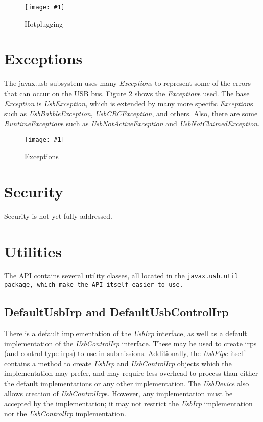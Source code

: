 \documentclass{article}
\newcommand{\myclass}[1]{\emph{#1}}
\newcommand{\myinterface}[1]{\emph{#1}}
\newcommand{\mypackage}[1]{\tt#1\rm}
\newcommand{\mysectionend}[0]{\vfill\pagebreak[1]}
\newcommand{\myfigure}[3]{\begin{figure}[htbp]\centering\texttt{[image: \#1]}\caption{#2}\label{#3}\end{figure}}
\begin{document}
\myfigure{figs/Hotplugging}{Hotplugging}{Hotplugging}

\mysectionend

\pagebreak

%

\section{Exceptions}

The javax.usb subsystem uses many \myclass{Exception}s to represent some of the
errors that can occur on the USB bus.  Figure \ref{Exceptions} shows the
\myclass{Exception}s used.  The base \myclass{Exception} is \myclass{UsbException}, which is extended by
many more specific \myclass{Exception}s such as \myclass{UsbBabbleException}, \myclass{UsbCRCException},
and others.  Also, there are some \myclass{RuntimeException}s such as \myclass{UsbNotActiveException}
and \myclass{UsbNotClaimedException}.

\myfigure{figs/Exceptions}{Exceptions}{Exceptions}

\mysectionend


%

\section{Security}

Security is not yet fully addressed.

\mysectionend

%

\section{Utilities}

The API contains several utility classes, all located in the \mypackage{javax.usb.util}
package, which make the API itself easier to use.

\subsection{DefaultUsbIrp and DefaultUsbControlIrp}

There is a default implementation of the \myinterface{UsbIrp} interface, as well as a default
implementation of the \myinterface{UsbControlIrp} interface.  These may be used to create irps
(and control-type irps) to use in submissions.  Additionally, the \myinterface{UsbPipe} itself
contains a method to create \myinterface{UsbIrp} and \myinterface{UsbControlIrp} objects which
the implementation may prefer, and may require less overhead to process than either the default
implementations or any other implementation.  The \myinterface{UsbDevice} also allows creation of
\myinterface{UsbControlIrp}s.  However, any implementation must be accepted by the implementation;
it may not restrict the \myinterface{UsbIrp} implementation nor the \myinterface{UsbControlIrp}
implementation.
\end{document}
